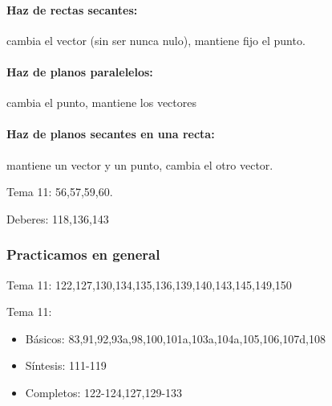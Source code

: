 \paragraph{Haz de rectas secantes: } cambia el vector (sin ser nunca nulo), mantiene fijo el punto.
\paragraph{Haz de planos paralelelos: } cambia el punto, mantiene los vectores
\paragraph{Haz de planos secantes en una recta: } mantiene un vector y un punto, cambia el otro vector.

\begin{problem}
Tema 11: 56,57,59,60.
\solution
\end{problem}

Deberes: 118,136,143

\subsubsection{Practicamos en general}

Tema 11: 
122,127,130,134,135,136,139,140,143,145,149,150

Tema 11:
\begin{itemize}
  \item Básicos: 83,91,92,93a,98,100,101a,103a,104a,105,106,107d,108
  \item Síntesis: 111-119
  \item Completos: 122-124,127,129-133
\end{itemize}



